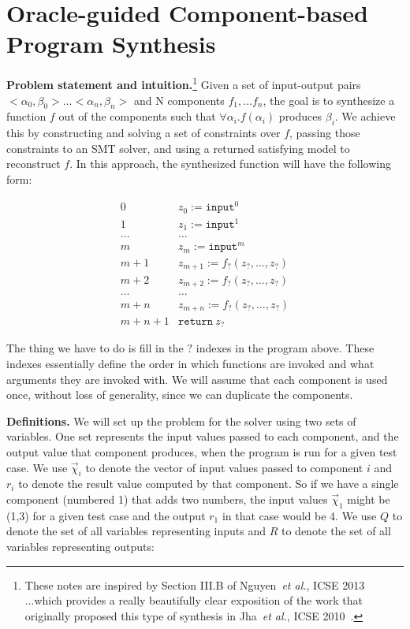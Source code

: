 \documentclass[11pt]{article}
\begin{document}
\section{Oracle-guided Component-based Program Synthesis}


\noindent \textbf{Problem statement and intuition.}\footnote{These notes are
  inspired by Section III.B of Nguyen~\emph{et al.}, ICSE 2013~\cite{Nguyen2013} ...which provides
  a really beautifully clear exposition of the work that originally proposed
  this type of synthesis in Jha~\emph{et al.}, ICSE 2010~\cite{Jha2010}.}
Given a set of input-output pairs  ${ < \alpha_0, \beta_0 > \ldots < \alpha_n, \beta_n > }$ and N components ${ f_1, \ldots f_n }$,  the goal is to synthesize a function $f$ out of the components such that $\forall \alpha_i. f(\alpha_i)$ produces $\beta_i$.
%
We achieve this by constructing and solving a set of constraints over $f$, passing those constraints to an SMT solver, and using a returned satisfying model to reconstruct $f$.
In this approach, the synthesized function will have the following form:

\[
\begin{array}{ll}
0 & z_0 := \mathtt{input}^0 \\
1 & z_1 := \mathtt{input}^1 \\
\ldots & \ldots \\
m & z_m := \mathtt{input}^m \\
m+1 & z_{m+1} := f_?(z_?, \ldots, z_?) \\
m+2 & z_{m+2} := f_?(z_?, \ldots, z_?) \\
\ldots & \ldots \\
m+n & z_{m+n} := f_?(z_?, \ldots, z_?) \\
m+n+1 & \mathtt{return}~ z_?
\end{array}
\]

The thing we have to do is fill in the $?$ indexes in the program above.  These
indexes essentially define the order in which functions are invoked and what
arguments they are invoked with.
We will assume that each component is used once, without loss of generality,
since we can duplicate the components.

\vspace{0.75em}
\noindent\textbf{Definitions.}
We will set up the problem for the solver using two sets of variables.  One set represents
the input values passed to each component, and the output value that component produces,
when the program is run for a given test case.  We use $\overrightarrow{\chi}_i$ to denote
the vector of input values passed to component $i$ and $r_i$ to denote the result value
computed by that component.  So if we have a single component (numbered 1) that adds
two numbers, the
input values $\overrightarrow{\chi}_1$ might be (1,3) for a given test case and the output
$r_1$ in that case would be 4.  We use $Q$ to denote the set of all variables representing
inputs and $R$ to denote the set of all variables representing outputs:
\end{document}
